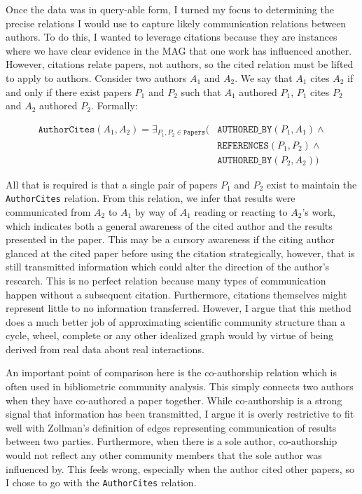 Once the data was in query-able form, I turned my focus to determining
the precise relations I would use to capture likely communication
relations between authors. To do this, I wanted to leverage citations
because they are instances where we have clear evidence in the MAG that
one work has influenced another. However, citations relate papers, not
authors, so the cited relation must be lifted to apply to authors.
Consider two authors \(A_1\) and \(A_2\). We say that \(A_1\) cites
\(A_2\) if and only if there exist papers \(P_1\) and \(P_2\) such that
\(A_1\) authored \(P_1\), \(P_1\) cites \(P_2\) and \(A_2\) authored
\(P_2\). Formally:

\begin{align*}
\texttt{AuthorCites}(A_1, A_2) = \exists_{ P_1, P_2 \in \texttt{Papers} } (                &\texttt{AUTHORED\_BY} (P_1, A_1) \land \\
   &\texttt{REFERENCES}(P_1, P_2) \land \\
   &\texttt{AUTHORED\_BY}(P_2, A_2) )
\end{align*}

All that is required is that a single pair of papers \(P_1\) and \(P_2\)
exist to maintain the \texttt{AuthorCites} relation. From this relation,
we infer that results were communicated from \(A_2\) to \(A_1\) by way
of \(A_1\) reading or reacting to \(A_2\)'s work, which indicates both a
general awareness of the cited author and the results presented in the
paper. This may be a cursory awareness if the citing author glanced at
the cited paper before using the citation strategically, however, that
is still transmitted information which could alter the direction of the
author's research. This is no perfect relation because many types of
communication happen without a subsequent citation. Furthermore,
citations themselves might represent little to no information
transferred. However, I argue that this method does a much better job of
approximating scientific community structure than a cycle, wheel,
complete or any other idealized graph would by virtue of being derived
from real data about real interactions.

An important point of comparison here is the co-authorship relation
which is often used in bibliometric community analysis. This simply
connects two authors when they have co-authored a paper together. While
co-authorship is a strong signal that information has been transmitted,
I argue it is overly restrictive to fit well with Zollman's definition
of edges representing communication of results between two parties.
Furthermore, when there is a sole author, co-authorship would not
reflect any other community members that the sole author was influenced
by. This feels wrong, especially when the author cited other papers, so
I chose to go with the \texttt{AuthorCites} relation.

